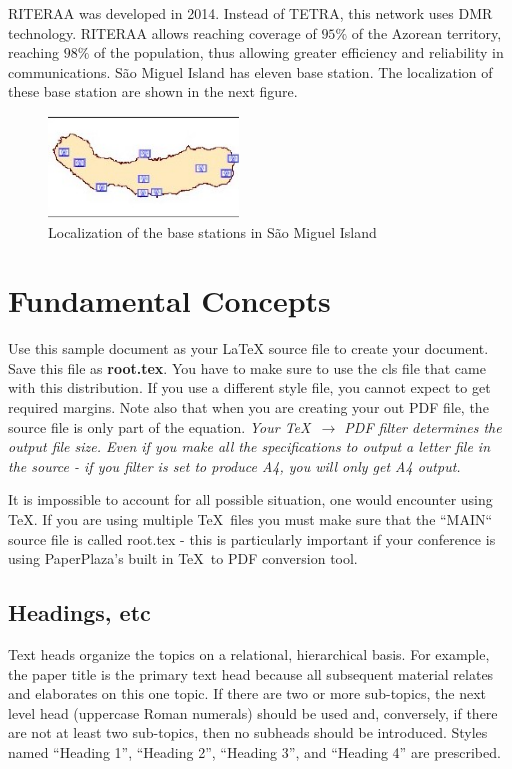 \documentclass[letterpaper, 10 pt, conference]{ieeeconf}  %
\begin{document}
RITERAA was developed in 2014. Instead of TETRA, this network uses DMR technology. RITERAA allows reaching coverage of $ 95 \% $ of the Azorean territory, reaching $ 98 \% $ of the population, thus allowing greater efficiency and reliability in communications. São Miguel Island has eleven base station. The localization of these base station are shown in the next figure. 
\begin{figure}[h]
    \centering
    \includegraphics[width=0.45\textwidth]{riteraaestacoesbase.jpg}
    \caption{Localization of the base stations in São Miguel Island}
    \label{fig:RITERAA}
\end{figure}
\FloatBarrier
\section{Fundamental Concepts}

Use this sample document as your LaTeX source file to create your document. Save this file as {\bf root.tex}. You have to make sure to use the cls file that came with this distribution. If you use a different style file, you cannot expect to get required margins. Note also that when you are creating your out PDF file, the source file is only part of the equation. \emph{Your \TeX\ $\rightarrow$ PDF filter determines the output file size. Even if you make all the specifications to output a letter file in the source - if you filter is set to produce A4, you will only get A4 output.}

It is impossible to account for all possible situation, one would encounter using \TeX. If you are using multiple \TeX\ files you must make sure that the ``MAIN`` source file is called root.tex - this is particularly important if your conference is using PaperPlaza's built in \TeX\ to PDF conversion tool.

\subsection{Headings, etc}

Text heads organize the topics on a relational, hierarchical basis. For example, the paper title is the primary text head because all subsequent material relates and elaborates on this one topic. If there are two or more sub-topics, the next level head (uppercase Roman numerals) should be used and, conversely, if there are not at least two sub-topics, then no subheads should be introduced. Styles named ``Heading 1'', ``Heading 2'', ``Heading 3'', and ``Heading 4'' are prescribed.
\end{document}
